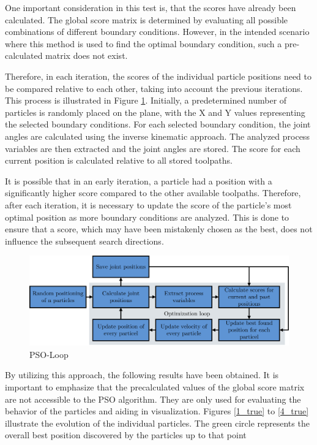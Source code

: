 One important consideration in this test is, that the scores have already been calculated. The global score matrix is determined by evaluating all possible combinations of different boundary conditions. However, in the intended scenario where this method is used to find the optimal boundary condition, such a pre-calculated matrix does not exist.

Therefore, in each iteration, the scores of the individual particle positions need to be compared relative to each other, taking into account the previous iterations. This process is illustrated in Figure \ref{swarmloop}. Initially, a predetermined number of particles is randomly placed on the plane, with the X and Y values representing the selected boundary conditions. For each selected boundary condition, the joint angles are calculated using the inverse kinematic approach. The analyzed process variables are then extracted and the joint angles are stored. The score for each current position is calculated relative to all stored toolpaths.

It is possible that in an early iteration, a particle had a position with a significantly higher score compared to the other available toolpaths. Therefore, after each iteration, it is necessary to update the score of the particle's most optimal position as more boundary conditions are analyzed. This is done to ensure that a score, which may have been mistakenly chosen as the best, does not influence the subsequent search directions.

\begin{figure}[H]
	\centerline{\includegraphics[width=1\textwidth]{figures/swarmloop.png}}
	\caption{PSO-Loop}
	\label{swarmloop}
\end{figure}

By utilizing this approach, the following results have been obtained. It is important to emphasize that the precalculated values of the global score matrix are not accessible to the \acrshort{PSO} algorithm. They are only used for evaluating the behavior of the particles and aiding in visualization. Figures \ref{1_true} to \ref{4_true} illustrate the evolution of the individual particles. The green circle represents the overall best position discovered by the particles up to that point


